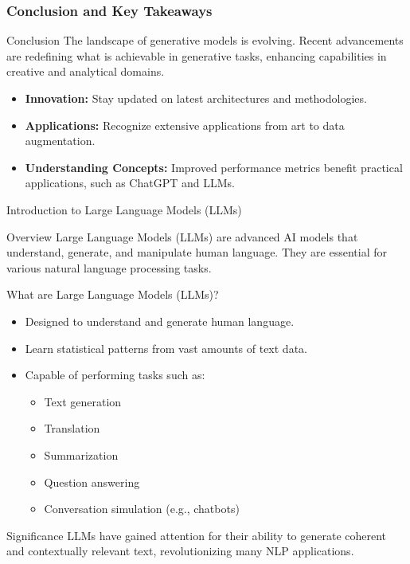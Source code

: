 \documentclass[aspectratio=169]{beamer}
\begin{document}
\begin{frame}[fragile]
    \frametitle{Conclusion and Key Takeaways}
    \begin{block}{Conclusion}
        The landscape of generative models is evolving. Recent advancements are redefining what is achievable in generative tasks, enhancing capabilities in creative and analytical domains.
    \end{block}
    \begin{itemize}
        \item \textbf{Innovation:} Stay updated on latest architectures and methodologies.
        \item \textbf{Applications:} Recognize extensive applications from art to data augmentation.
        \item \textbf{Understanding Concepts:} Improved performance metrics benefit practical applications, such as ChatGPT and LLMs.
    \end{itemize}
\end{frame}

\begin{frame}[fragile]{Introduction to Large Language Models (LLMs)}

\begin{block}{Overview}
Large Language Models (LLMs) are advanced AI models that understand, generate, and manipulate human language. They are essential for various natural language processing tasks.
\end{block}

\end{frame}

\begin{frame}[fragile]{What are Large Language Models (LLMs)?}

\begin{itemize}
    \item Designed to understand and generate human language.
    \item Learn statistical patterns from vast amounts of text data.
    \item Capable of performing tasks such as:
    \begin{itemize}
        \item Text generation
        \item Translation
        \item Summarization
        \item Question answering
        \item Conversation simulation (e.g., chatbots)
    \end{itemize}
\end{itemize}

\begin{block}{Significance}
LLMs have gained attention for their ability to generate coherent and contextually relevant text, revolutionizing many NLP applications.
\end{block}

\end{frame}
\end{document}
